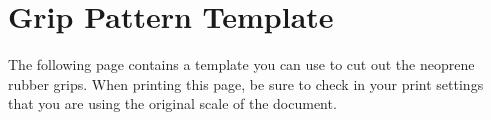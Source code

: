 
\chapter{Grip Pattern Template} %

\label{AppendixA}

The following page contains a template you can use to cut out the neoprene rubber grips. When printing this page, be sure to check in your print settings that you are using the original scale of the document.
